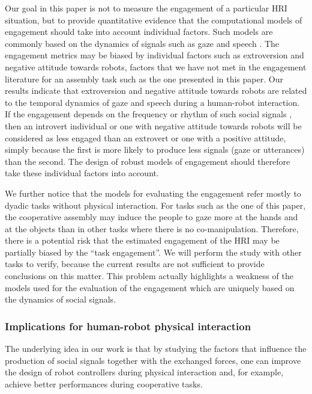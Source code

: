 Our goal in this paper is not to measure the engagement of a particular HRI situation, but to provide quantitative evidence that the computational models of engagement should take into account individual factors. Such models are commonly based on the dynamics of signals such as gaze and speech \cite{Anzalone2015engagement,sidner2004,rich2010recognizing}.
The engagement metrics may be biased by individual factors such as extroversion and negative attitude towards robots, factors that we have not met in the engagement literature for an assembly task such as the one presented in this paper.
Our results indicate that extroversion and negative attitude towards robots are related to the temporal dynamics of gaze and speech during a human-robot interaction.
If the engagement depends on the frequency or rhythm of such social signals \cite{rich2010recognizing}, then an introvert individual or one with negative attitude towards robots will be considered as less engaged than an extrovert or one with a positive attitude, simply because the first is more likely to produce less signals (gaze or utterances) than the second.
The design of robust models of engagement should therefore take these individual factors into account.

We further notice that the models for evaluating the engagement refer mostly to dyadic tasks without physical interaction. For tasks such as the one of this paper, the cooperative assembly may induce the people to gaze more at the hands and at the objects than in other tasks where there is no co-manipulation. 
Therefore, there is a potential risk that the estimated engagement of the HRI may be partially biased by the ``task engagement''. We will perform the study with other tasks to verify, because the current results are not sufficient to provide conclusions on this matter.
This problem actually highlights a weakness of the models used for the evaluation of the engagement which are uniquely based on the dynamics of social signals.


\subsubsection{Implications for human-robot physical interaction}

The underlying idea in our work is that by studying the factors that influence the production of social signals together with the exchanged forces, one can improve the design of robot controllers during physical interaction and, for example, achieve better performances during cooperative tasks.

